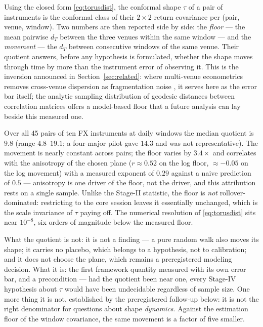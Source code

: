 \documentclass[11pt,a4paper]{article}
\numberwithin{equation}{section}
\begin{document}
Using the closed form \eqref{eq:torusdist}, the conformal shape
$\tau$ of a pair of instruments is the conformal class of their
$2\times2$ return covariance per (pair, venue, window). Two numbers
are then reported side by side: the \emph{floor} --- the mean
pairwise $d_T$ between the three venues within the same window ---
and the \emph{movement} --- the $d_T$ between consecutive windows
of the same venue. Their quotient answers, before any hypothesis is
formulated, whether the shape moves through time by more than the
instrument error of observing it. This is the inversion announced
in Section~\ref{sec:related}: where multi-venue econometrics
removes cross-venue dispersion as fragmentation noise
\cite{DiasSchweikert2026}, it serves here as the error bar itself;
the analytic sampling distribution of geodesic distances between
correlation matrices \cite{Kuketayev2026} offers a model-based
floor that a future analysis can lay beside this measured one.

Over all 45 pairs of ten FX instruments at daily windows the median
quotient is $9.8$ (range $4.8$--$19.1$; a four-major pilot gave
$14.3$ and was not representative). The movement is nearly constant
across pairs; the floor varies by $3.4\times$ and correlates with
the anisotropy of the chosen plane ($r\approx0.52$ on the log
floor, $\approx-0.05$ on the log movement) with a measured exponent
of $0.29$ against a naive prediction of $0.5$ --- anisotropy is one
driver of the floor, not the driver, and this attribution rests on
a single sample. Unlike the Stage-II statistic, the floor is
\emph{not} rollover-dominated: restricting to the core session
leaves it essentially unchanged, which is the scale invariance of
$\tau$ paying off. The numerical resolution of
\eqref{eq:torusdist} sits near $10^{-8}$, six orders of magnitude
below the measured floor.

What the quotient is not: it is not a finding --- a pure random
walk also moves its shape; it carries no placebo, which belongs to
a hypothesis, not to calibration; and it does not choose the plane,
which remains a preregistered modeling decision. What it is: the
first framework quantity measured with its own error bar, and a
precondition --- had the quotient been near one, every Stage-IV
hypothesis about $\tau$ would have been undecidable regardless of
sample size. One more thing it is not, established by the
preregistered follow-up below: it is not the right denominator for
questions about shape \emph{dynamics}. Against the estimation
floor of the window covariance, the same movement is a factor of
five smaller.
\end{document}
